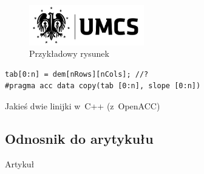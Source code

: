 \begin{figure}[b]
    \begin{center}
        \includegraphics[width=5cm]{fig/LogoUMCS}
    \end{center}
    \caption{Przykładowy rysunek}\label{rys:przyk}
\end{figure}

\begin{lstfloat}[b]
    \lstset{language=C++}
    \begin{lstlisting}[frame=single]
tab[0:n] = dem[nRows][nCols]; //?
#pragma acc data copy(tab [0:n], slope [0:n])
\end{lstlisting}
    \caption{Jakieś dwie linijki w~C++ (z~OpenACC)}\label{lst:przyk}
\end{lstfloat}

\subsection{Odnosnik do arytykułu}
Artykuł~\cite{bib:art1}
